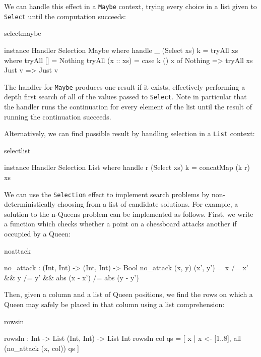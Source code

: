 \noindent
We can handle this effect in a \texttt{Maybe} context, trying every choice
in a list given to \texttt{Select} until the computation succeeds:

\begin{SaveVerbatim}{selectmaybe}

instance Handler Selection Maybe where
     handle _ (Select xs) k = tryAll xs where
         tryAll [] = Nothing
         tryAll (x :: xs) = case k () x of
                                 Nothing => tryAll xs
                                 Just v => Just v

\end{SaveVerbatim}

\noindent
The handler for \texttt{Maybe} produces one result if it exists, effectively
performing a depth first search of all of the values passed to \texttt{Select}.
Note in particular that the handler runs the continuation for every element
of the list until the result of running the continuation succeeds.

Alternatively, we can find  possible result by handling selection
in a \texttt{List} context:

\begin{SaveVerbatim}{selectlist}

instance Handler Selection List where
     handle r (Select xs) k = concatMap (k r) xs

\end{SaveVerbatim}

\noindent
We can use the \texttt{Selection} effect to implement search problems by
non-deterministically choosing from a list of candidate solutions. For example,
a solution to the n-Queens problem can be implemented as follows.
First, we write a function which checks whether a point on a chessboard
attacks another if occupied by a Queen:

\begin{SaveVerbatim}{noattack}

no_attack : (Int, Int) -> (Int, Int) -> Bool
no_attack (x, y) (x', y')
  = x /= x' && y /= y' && abs (x - x') /= abs (y - y')

\end{SaveVerbatim}

\noindent
Then, given a column and a list of Queen positions, we find the rows on which
a Queen may safely be placed in that column using a list comprehension:

\begin{SaveVerbatim}{rowsin}

rowsIn : Int -> List (Int, Int) -> List Int
rowsIn col qs 
   = [ x | x <- [1..8], all (no_attack (x, col)) qs ]

\end{SaveVerbatim}


